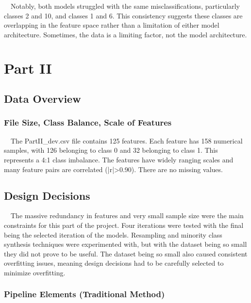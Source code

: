 \documentclass[12pt]{article}
\begin{document}
\ \ Notably, both models struggled with the same misclassifications, particularly classes 2 and 10, and classes 1 and 6. This consistency suggests these classes are overlapping in the feature space rather than a limitation of either model architecture. Sometimes, the data is a limiting factor, not the model architecture.



\section{Part II}

\subsection{Data Overview}

\subsubsection{File Size, Class Balance, Scale of Features}

\ \ The PartII\_dev.csv file contains 125 features. Each feature has 158 numerical samples, with 126 belonging to class 0 and 32 belonging to class 1. This represents a 4:1 class imbalance. The features have widely ranging scales and many feature pairs are correlated (|r|>0.90). There are no missing values.


\subsection{Design Decisions}
\ \ The massive redundancy in features and very small sample size were the main constraints for this part of the project. Four iterations were tested with the final being the selected iteration of the models. Resampling and minority class synthesis techniques were experimented with, but with the dataset being so small they did not prove to be useful. The dataset being so small also caused consistent overfitting issues, meaning design decisions had to be carefully selected to minimize overfitting.

\subsubsection{Pipeline Elements (Traditional Method)}
 
\end{document}
